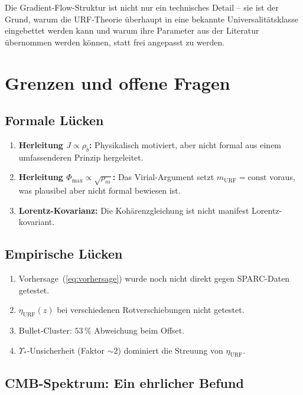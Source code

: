 \documentclass[12pt,a4paper]{article}
\theoremstyle{definition}
\begin{document}
Die Gradient-Flow-Struktur ist nicht nur ein technisches Detail -- sie
ist der Grund, warum die URF-Theorie überhaupt in eine bekannte
Universalitätsklasse eingebettet werden kann und warum ihre Parameter
aus der Literatur übernommen werden können, statt frei angepasst
zu werden.


\section{Grenzen und offene Fragen}
\label{sec:grenzen}

\subsection{Formale Lücken}

\begin{enumerate}
\item \textbf{Herleitung $J \propto \rho_b$:} Physikalisch motiviert,
aber nicht formal aus einem umfassenderen Prinzip hergeleitet.
\item \textbf{Herleitung $\Phi_{\mathrm{max}} \propto \sqrt{\rho_m}$:}
Das Virial-Argument setzt $m_{\mathrm{URF}} = \mathrm{const}$ voraus,
was plausibel aber nicht formal bewiesen ist.
\item \textbf{Lorentz-Kovarianz:} Die Kohärenzgleichung ist nicht
manifest Lorentz-kovariant.
\end{enumerate}

\subsection{Empirische Lücken}

\begin{enumerate}
\item Vorhersage~(\ref{eq:vorhersage}) wurde noch nicht direkt gegen
SPARC-Daten getestet.
\item $\eta_{\mathrm{URF}}(z)$ bei verschiedenen Rotverschiebungen nicht getestet.
\item Bullet-Cluster: $53\,\%$ Abweichung beim Offset.
\item $\Upsilon_*$-Unsicherheit (Faktor $\sim 2$) dominiert die Streuung von $\eta_{\mathrm{URF}}$.
\end{enumerate}

\subsection{CMB-Spektrum: Ein ehrlicher Befund}
\end{document}
